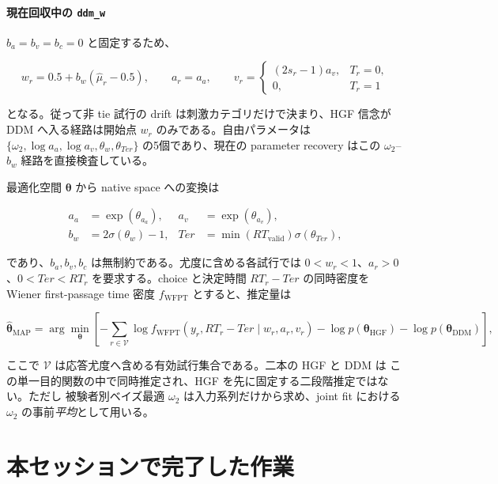 \documentclass[11pt]{ltjsarticle}
\newcommand{\code}[1]{\texttt{#1}}
\begin{document}
\paragraph{現在回収中の \code{ddm\_w}}
\(b_a=b_v=b_c=0\) と固定するため、

\[
w_r=0.5+b_w(\hat\mu_r-0.5),\qquad
a_r=a_a,\qquad
v_r=
\begin{cases}
(2s_r-1)a_v,&T_r=0,\\
0,&T_r=1
\end{cases}
\]

となる。従って非 tie 試行の drift は刺激カテゴリだけで決まり、HGF 信念が DDM
へ入る経路は開始点 \(w_r\) のみである。自由パラメータは
\(\{\omega_2,\log a_a,\log a_v,\theta_w,\theta_{Ter}\}\) の5個であり、現在の
parameter recovery はこの \(\omega_2\)--\(b_w\) 経路を直接検査している。

最適化空間 \(\boldsymbol\theta\) から native space への変換は

\begin{align}
a_a&=\exp(\theta_{a_a}), &
a_v&=\exp(\theta_{a_v}),\\
b_w&=2\sigma(\theta_w)-1, &
Ter&=\min(RT_{\mathrm{valid}})\sigma(\theta_{Ter}),
\end{align}

であり、\(b_a,b_v,b_c\) は無制約である。尤度に含める各試行では
\(0<w_r<1\)、\(a_r>0\)、\(0<Ter<RT_r\) を要求する。choice と決定時間
\(RT_r-Ter\) の同時密度を Wiener first-passage time 密度
\(f_{\mathrm{WFPT}}\) とすると、推定量は

\[
\hat{\boldsymbol\theta}_{\mathrm{MAP}}
=\arg\min_{\boldsymbol\theta}
\left[
-\sum_{r\in\mathcal{V}}
 \log f_{\mathrm{WFPT}}(y_r,RT_r-Ter\mid w_r,a_r,v_r)
-\log p(\boldsymbol\theta_{\mathrm{HGF}})
-\log p(\boldsymbol\theta_{\mathrm{DDM}})
\right],
\]

ここで \(\mathcal{V}\) は応答尤度へ含める有効試行集合である。二本の HGF と DDM は
この単一目的関数の中で同時推定され、HGF を先に固定する二段階推定ではない。ただし
被験者別ベイズ最適 \(\omega_2\) は入力系列だけから求め、joint fit における
\(\omega_2\) の事前\emph{平均}として用いる。

\section{本セッションで完了した作業}
\end{document}
